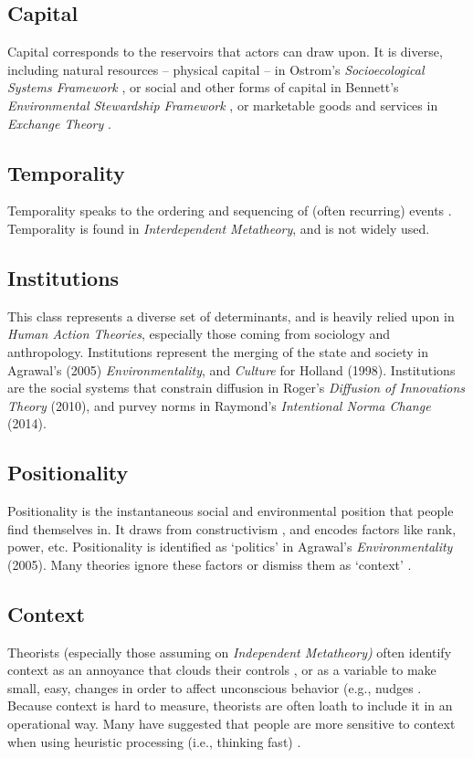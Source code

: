 \documentclass[12 pt]{article}
\begin{document}
		\subsection{Capital}	
		Capital corresponds to the reservoirs that actors can draw upon. It is diverse, including natural resources -- physical capital -- in Ostrom's \textit{Socioecological Systems Framework} \parencite{Mcginnis2014}, or social and other forms of capital in Bennett's \textit{Environmental Stewardship Framework} \parencite{Bennett2018}, or marketable goods and services in \textit{Exchange Theory} \parencite{Kotler2000}. 
		\subsection{Temporality}
		Temporality speaks to the ordering and sequencing of (often recurring) events \parencite{Hand2005}. Temporality is found in \textit{Interdependent Metatheory}, and is not widely used. 
		\subsection{Institutions}
		This class represents a diverse set of determinants, and is heavily relied upon in \textit{Human Action Theories}, especially those coming from sociology and anthropology. Institutions represent the merging of the state and society in Agrawal's (2005) \textit{Environmentality}, and \textit{Culture} for Holland (1998). Institutions are the social systems that constrain diffusion in Roger's \textit{Diffusion of Innovations Theory} (2010), and purvey norms in Raymond's \textit{Intentional Norma Change} (2014). 
		\subsection{Positionality}
		Positionality is the instantaneous social and environmental position that people find themselves in. It draws from constructivism \parencite{Holland1998}, and encodes factors like rank, power, etc. Positionality is identified as `politics' in Agrawal's \textit{Environmentality} (2005). Many theories ignore these factors or dismiss them as `context' \parencite{Shove2010}. 
		\subsection{Context}
		 Theorists (especially those assuming on \textit{Independent Metatheory)} often identify context as an annoyance that clouds their controls  \parencite{Ajzen1985,Shove2010}, or as a variable to make small, easy, changes in order to affect unconscious behavior (e.g., nudges \parencite{Thaler2013}. Because context is hard to measure, theorists are often loath to include it in an operational way. Many have suggested that people are more sensitive to context when using heuristic processing (i.e., thinking fast) \parencite{Chaiken1980,Thaler2008,Kahneman2011}. 
\end{document}
